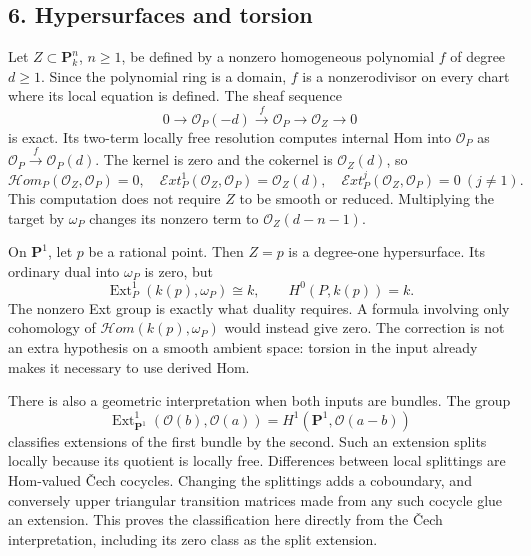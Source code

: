 \documentclass[11pt]{article}
\begin{document}
\subsection{6. Hypersurfaces and
torsion}\label{hypersurfaces-and-torsion}

Let \(Z\subset\mathbf P^n_k\), \(n\geq1\), be defined by a nonzero
homogeneous polynomial \(f\) of degree \(d\geq1\). Since the polynomial
ring is a domain, \(f\) is a nonzerodivisor on every chart where its
local equation is defined. The sheaf sequence \[
0\to\mathcal O_P(-d)\xrightarrow{f}\mathcal O_P
 \to\mathcal O_Z\to0
\] is exact. Its two-term locally free resolution computes internal Hom
into \(\mathcal O_P\) as \(\mathcal O_P\xrightarrow{f}\mathcal O_P(d)\).
The kernel is zero and the cokernel is \(\mathcal O_Z(d)\), so \[
\mathcal H om_P(\mathcal O_Z,\mathcal O_P)=0,
\quad\mathcal E xt^1_P(\mathcal O_Z,\mathcal O_P)=\mathcal O_Z(d),
\quad\mathcal E xt^j_P(\mathcal O_Z,\mathcal O_P)=0\ (j\ne1).
\tag{10}
\] This computation does not require \(Z\) to be smooth or reduced.
Multiplying the target by \(\omega_P\) changes its nonzero term to
\(\mathcal O_Z(d-n-1)\).

On \(\mathbf P^1\), let \(p\) be a rational point. Then \(Z=p\) is a
degree-one hypersurface. Its ordinary dual into \(\omega_P\) is zero,
but \[
\operatorname{Ext}^1_P(k(p),\omega_P)\cong k,
\qquad H^0(P,k(p))=k.
\] The nonzero Ext group is exactly what duality requires. A formula
involving only cohomology of \(\mathcal H om(k(p),\omega_P)\) would
instead give zero. The correction is not an extra hypothesis on a smooth
ambient space: torsion in the input already makes it necessary to use
derived Hom.

There is also a geometric interpretation when both inputs are bundles.
The group \[
\operatorname{Ext}^1_{\mathbf P^1}(\mathcal O(b),\mathcal O(a))
 =H^1(\mathbf P^1,\mathcal O(a-b))
\] classifies extensions of the first bundle by the second. Such an
extension splits locally because its quotient is locally free.
Differences between local splittings are Hom-valued Čech cocycles.
Changing the splittings adds a coboundary, and conversely upper
triangular transition matrices made from any such cocycle glue an
extension. This proves the classification here directly from the Čech
interpretation, including its zero class as the split extension.
\end{document}
